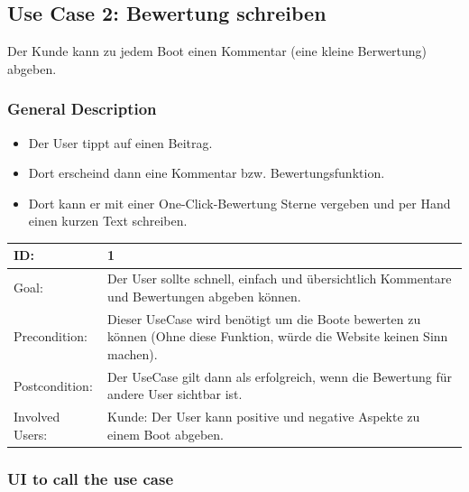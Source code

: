\documentclass[12pt]{article}
\theoremstyle{definition}
\begin{document}
\pagebreak

\subsection{Use Case 2: Bewertung schreiben}
Der Kunde kann zu jedem Boot einen Kommentar (eine kleine Berwertung) abgeben.
\subsubsection{General Description}
	\begin{itemize}
		\item Der User tippt auf einen Beitrag.
		\item Dort erscheind dann eine Kommentar bzw. Bewertungsfunktion.
		\item Dort kann er mit einer One-Click-Bewertung Sterne vergeben und per Hand einen kurzen Text schreiben.
	\end{itemize}

\begin{tabular}{|p{.2\linewidth}|p{.65\linewidth}|}
\hline 
ID: & 1 \\ \hline
Goal: & Der User sollte schnell, einfach und übersichtlich Kommentare und Bewertungen abgeben können. \\ \hline
Precondition: & Dieser UseCase wird benötigt um die Boote bewerten zu können (Ohne diese Funktion, würde die Website keinen Sinn machen). \\ \hline
Postcondition: & Der UseCase gilt dann als erfolgreich, wenn die Bewertung für andere User sichtbar ist. \\ \hline
Involved Users: &Kunde: Der User kann positive und negative Aspekte zu einem Boot abgeben. \\ \hline
\end{tabular}

\subsubsection{UI to call the use case}
\end{document}
